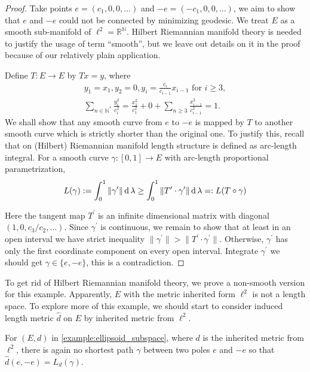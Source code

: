 \begin{proof}
	Take points $e=(c_1, 0,0,\ldots)$ and $-e=(-c_1, 0,0,\ldots)$,
	we aim to show that $e$ and $-e$ could not be connected by minimizing geodesic.
	We treat $E$ as a smooth sub-manifold of $\ell^2 = \mathbb{R}^\mathbb{N}$.
	Hilbert Riemannian manifold theory is needed to justify the usage of term ``smooth'',
	but we leave out details on it in the proof because of our relatively plain application.

	Define \( T: E \rightarrow E \) by \( T x = y \), where
	\begin{gather*}
		y _ { 1 } = x _ { 1 } , y _ { 2 } = 0 , y _ { i } = \frac{c_i}{c_{i-1}} x_{i-1} \text { for } i \geq 3, \\
		\sum_{n \in \mathbb{N}^*} \frac{y_i^2}{c_i^2} = \frac{x_1^2}{c_1^2} + 0 + \sum_{n \geq 3} \frac{x_{i-1}^2}{c_{i-1}^2}=1.
	\end{gather*}
	We shall show that any smooth curve from \( e\) to \( -e \) is mapped by \( T \)
	to another smooth curve which is strictly shorter than the original one.
	To justify this, recall that on (Hilbert) Riemannian manifold length structure is defined as arc-length integral.
	For a smooth curve $\gamma: [0,1] \rightarrow E$ with arc-length proportional parametrization,
	\[
		L(\gamma) := \int_{0}^{1} \| \gamma^\prime \| \operatorname{d} \lambda \geq
		\int_{0}^{1} \| T^\prime \cdot \gamma^\prime \| \operatorname{d} \lambda =: L(T \circ \gamma)
	\]

	Here the tangent map $T^\prime$ is an infinite dimensional matrix with
	diagonal $(1,0,{c_3}/{c_2}, \ldots)$.
	Since $\gamma^\prime$ is continuous,
	we remain to show that at least in an open interval we have strict inequality
	$\| \gamma^\prime \| > \| T^\prime \cdot \gamma^\prime \|$.
	Otherwise, $\gamma^\prime$ has only the first coordinate component on every open interval.
	Integrate $\gamma^\prime$ we should get $\gamma \in \{ e, -e\}$, this is a contradiction.
\end{proof}

To get rid of Hilbert Riemannian manifold theory,
we prove a non-smooth version for this example.
Apparently, $E$ with the metric inherited form $\ell^2$ is not a length space.
To explore more of this example,
we should start to consider induced length metric $\hat{d}$ on $E$ by inherited metric from $\ell^2$.

\begin{lem}
	For $(E, d)$ in \cref{example:ellipsoid_subspace}, where $d$ is the inherited metric from $\ell^2$,
	there is again no shortest path $\gamma$ between two poles $e$ and $-e$
	so that $\hat{d}(e, -e) = L_d (\gamma)$.
\end{lem}

